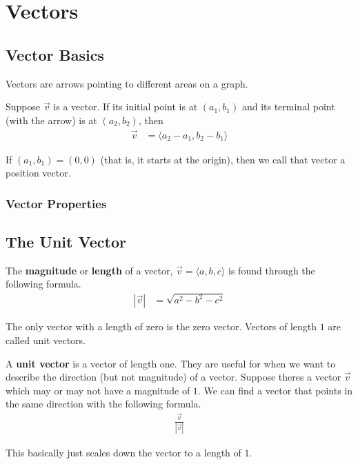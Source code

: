 \section{Vectors}

\subsection{Vector Basics}
Vectors are arrows pointing to different areas on a graph.

\begin{definition}
    Suppose $\vec{v}$ is a vector. If its initial point is at $(a_1,b_1)$ and its terminal point (with the arrow) is at $(a_2, b_2)$, then
    \begin{align*}
        \vec{v} &= \langle a_2 - a_1, b_2 - b_1 \rangle
    \end{align*}

    If $(a_1, b_1) = (0,0)$ (that is, it starts at the origin), then we call that vector a position vector.
\end{definition}

\subsubsection{Vector Properties}

\subsection{The Unit Vector}
\begin{definition}
    The \textbf{magnitude} or \textbf{length} of a vector, $\vec{v} = \langle a, b, c \rangle$ is found through the following formula.
    \begin{align*}
        | \vec{v} | &= \sqrt{a^2 - b^2 - c^2}
    \end{align*}

    The only vector with a length of zero is the zero vector. Vectors of length $1$ are called unit vectors.
\end{definition}

\begin{definition}
    A \textbf{unit vector} is a vector of length one. They are useful for when we want to describe the direction (but not magnitude) of a vector.
    Suppose theres a vector $\vec{v}$ which may or may not have a magnitude of $1$. We can find a vector that points in the same direction with the
    following formula.
    \begin{align*}
        \frac{\vec{v}}{|\vec{v}|}
    \end{align*}

    This basically just scales down the vector to a length of $1$.
\end{definition}

